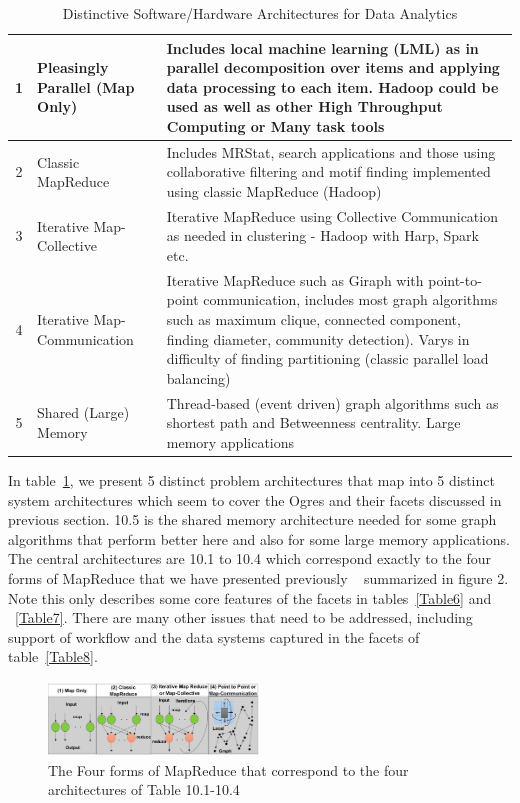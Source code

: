 \documentclass{acm_proc_article-sp}
\begin{document}
\begin{table}[h]
\centering
\caption{Distinctive Software/Hardware Architectures for Data Analytics}
\label{Table10}
\begin{tabular}{|c|p{2cm}|p{5.75cm}|} \hline
1 & Pleasingly Parallel (Map Only) & Includes local machine learning (LML) as in parallel decomposition over items and applying data processing to each item. Hadoop could be used as well as other High Throughput Computing or Many task tools \\ \hline
2 & Classic MapReduce & Includes MRStat, search applications and those using collaborative filtering and motif finding implemented using classic MapReduce (Hadoop)\\ \hline
3 & Iterative Map-Collective & Iterative MapReduce using Collective Communication as needed in clustering - Hadoop with Harp, Spark etc. \\ \hline
4 & Iterative Map-Communication & Iterative MapReduce such as Giraph with point-to-point communication, includes most graph algorithms such as maximum clique,  connected component, finding diameter, community detection). Varys in difficulty of finding partitioning (classic parallel load balancing)\\ \hline
5 & Shared (Large) Memory & Thread-based (event driven) graph algorithms such as shortest path and Betweenness centrality. Large memory applications

\\ \hline
\end{tabular}
\end{table}

In table~\ref{Table10}, we present 5 distinct problem architectures that map into 5 distinct system architectures which seem to cover the Ogres and their facets discussed in previous section. 10.5 is the shared memory architecture needed for some graph algorithms that perform better here and also for some large memory applications. The central architectures are 10.1 to 10.4 which correspond exactly to the four forms of MapReduce that we have presented previously ~\cite{b18} summarized in figure 2. Note this only describes some core features of the facets in tables~\ref{Table6} and ~\ref{Table7}. There are many other issues that need to be addressed, including support of workflow and the data systems captured in the facets of table~\ref{Table8}.

\begin{figure}
\centering
\includegraphics[width=0.5\textwidth]{mapreduce-four.png}
\caption{The Four forms of MapReduce that correspond to the four architectures of Table 10.1-10.4}
\end{figure}
\end{document}
